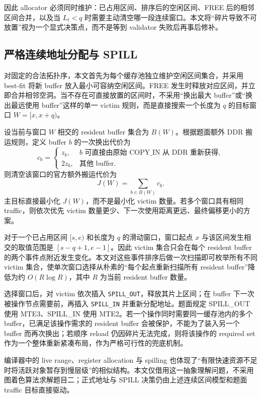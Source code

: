 因此 allocator 必须同时维护：已占用区间、排序后的空闲区间、FREE 后的相邻区间合并，以及当 $L_t<q$ 时需要主动清空哪一段连续窗口。本文将“碎片导致不可放置”视为一个显式决策点，而不是等到 validator 失败后再事后修补。

\subsection{严格连续地址分配与 SPILL}

对固定的合法拓扑序，本文首先为每个缓存池独立维护空闲区间集合，并采用 best-fit 将新 buffer 放入最小可容纳空闲区间。FREE 发生时释放对应区间，并立即合并相邻空洞。当不存在可直接放置的区间时，不采用“换出最大 buffer”或“换出最远使用 buffer”这样的单一 victim 规则，而是直接搜索一个长度为 $q$ 的目标窗口 $W=[x,x+q)$。

设当前与窗口 $W$ 相交的 resident buffer 集合为 $B(W)$。根据题面额外 DDR 搬运规则，定义 buffer $b$ 的一次换出代价为
\[
c_b=
\begin{cases}
z_b, & b\text{ 可直接由原始 COPY\_IN 从 DDR 重新获得},\\
2z_b, & \text{其他 buffer}.
\end{cases}
\]
则清空该窗口的官方额外搬运代价为
\[
J(W)=\sum_{b\in B(W)}c_b.
\]
主目标直接最小化 $J(W)$，而不是最小化 victim 数量。若多个窗口具有相同 traffic，则依次优先 victim 数量更少、下一次使用距离更远、最终偏移更小的方案。

对于一个已占用区间 $[s,e)$ 和长度为 $q$ 的滑动窗口，窗口起点 $x$ 与该区间发生相交的取值范围是 $[s-q+1,e-1]$。因此 victim 集合只会在每个 resident buffer 的两个事件点附近发生变化。本文对这些事件排序后做一次扫描即可枚举所有不同 victim 集合，使单次窗口选择从朴素的“每个起点重新扫描所有 resident buffer”降低为约 $O(R\log R)$，其中 $R$ 为当前 resident buffer 数量。

选择窗口后，对 victim 依次插入 \texttt{SPILL\_OUT}，释放其片上区间；在 buffer 下一次被操作节点需要前，再插入 \texttt{SPILL\_IN} 并重新分配地址。题面规定 SPILL\_OUT 使用 MTE3、SPILL\_IN 使用 MTE2。若一个操作同时需要同一缓存池内的多个 buffer，已满足该操作需求的 resident buffer 会被保护，不能为了装入另一个 buffer 而再次换出；若顺序 reload 仍因碎片无法完成，则将该操作的 required set 作为一个整体重新紧凑布局，作为严格可行性的兜底机制。

编译器中的 live range、register allocation 与 spilling 也体现了“有限快速资源不足时将活跃对象暂存到慢层级”的相似结构\cite{chaitin1981coloring,poletto1999linear}。本文仅借用这一抽象理解问题，不采用图着色算法求解题目二；正式地址与 SPILL 决策仍由上述连续区间模型和题面 traffic 目标直接驱动。

